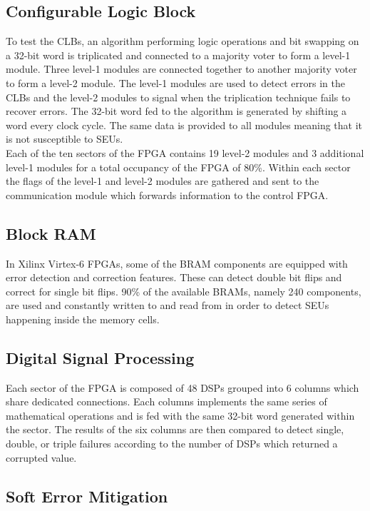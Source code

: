     \subsection{Configurable Logic Block}

      To test the CLBs, an algorithm performing logic operations and bit swapping on a 32-bit word is triplicated and connected to a majority voter to form a level-1 module. Three level-1 modules are connected together to another majority voter to form a level-2 module. The level-1 modules are used to detect errors in the CLBs and the level-2 modules to signal when the triplication technique fails to recover errors. The 32-bit word fed to the algorithm is generated by shifting a word every clock cycle. The same data is provided to all modules meaning that it is not susceptible to SEUs. \\

      Each of the ten sectors of the FPGA contains 19 level-2 modules and 3 additional level-1 modules for a total occupancy of the FPGA of 80\%. Within each sector the flags of the level-1 and level-2 modules are gathered and sent to the communication module which forwards information to the control FPGA.

    \subsection{Block RAM}

      In Xilinx Virtex-6 FPGAs, some of the BRAM components are equipped with error detection and correction features. These can detect double bit flips and correct for single bit flips. 90\% of the available BRAMs, namely 240 components, are used and constantly written to and read from in order to detect SEUs happening inside the memory cells.

    \subsection{Digital Signal Processing}

      Each sector of the FPGA is composed of 48 DSPs grouped into 6 columns which share dedicated connections. Each columns implements the same series of mathematical operations and is fed with the same 32-bit word generated within the sector. The results of the six columns are then compared to detect single, double, or triple failures according to the number of DSPs which returned a corrupted value.

    \subsection{Soft Error Mitigation}

